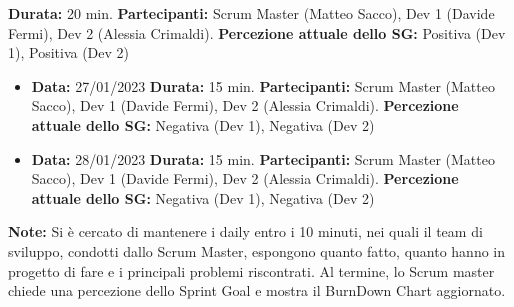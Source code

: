 \documentclass[a4paper, oneside]{article}
\newcommand\tre{Scrum Master (Matteo Sacco), Dev 1 (Davide Fermi), Dev 2 (Alessia Crimaldi).}
\begin{document}
\begin{landscape}
\begin{itemize}
            \newline \textbf{Durata:} 20 min.
            \newline \textbf{Partecipanti:} \tre
            \newline \textbf{Percezione attuale dello SG:} Positiva (Dev 1), Positiva (Dev 2)
        \end{itemize}
        \begin{itemize}
            \item \textbf{Data:} 27/01/2023
            \newline \textbf{Durata:} 15 min.
            \newline \textbf{Partecipanti:} \tre
            \newline \textbf{Percezione attuale dello SG:} Negativa (Dev 1), Negativa (Dev 2)
        \end{itemize}
        \begin{itemize}
            \item \textbf{Data:} 28/01/2023
            \newline \textbf{Durata:} 15 min.
            \newline \textbf{Partecipanti:} \tre
            \newline \textbf{Percezione attuale dello SG:} Negativa (Dev 1), Negativa (Dev 2)
        \end{itemize}
        \vspace{2mm} %
        \textbf{Note:} Si è cercato di mantenere i daily entro i 10 minuti, nei quali il team di sviluppo, condotti dallo Scrum Master, espongono quanto fatto, quanto hanno in progetto di fare e i principali problemi riscontrati. Al termine, lo Scrum master chiede una percezione dello Sprint Goal e mostra il BurnDown Chart aggiornato.

        \newpage

\end{landscape}
\end{document}
